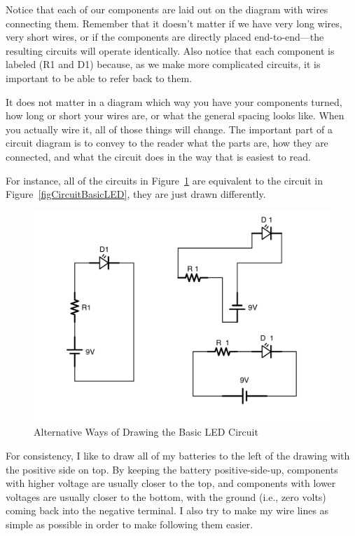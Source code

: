 Notice that each of our components are laid out on the diagram with wires connecting them.
Remember that it doesn't matter if we have very long wires, very short wires, or if the components are directly placed end-to-end---the resulting circuits will operate identically.
Also notice that each component is labeled (R1 and D1) because, as we make more complicated circuits, it is important to be able to refer back to them.

It does not matter in a diagram which way you have your components turned, how long or short your wires are, or what the general spacing looks like.
When you actually wire it, all of those things will change.
The important part of a circuit diagram is to convey to the reader what the parts are, how they are connected, and what the circuit does in the way that is easiest to read.

For instance, all of the circuits in Figure~\ref{figCircuitLEDAlt} are equivalent to the circuit in Figure~\ref{figCircuitBasicLED}, they are just drawn differently.

\begin{figure}
\caption{Alternative Ways of Drawing the Basic LED Circuit}
\centering
\label{figCircuitLEDAlt}
\includegraphics[scale=0.08]{CircuitLEDAlt}
\end{figure}

For consistency, I like to draw all of my batteries to the left of the drawing with the positive side on top.
By keeping the battery positive-side-up, components with higher voltage are usually closer to the top, and components with lower voltages are usually closer to the bottom, with the ground (i.e., zero volts) coming back into the negative terminal.
I also try to make my wire lines as simple as possible in order to make following them easier.

